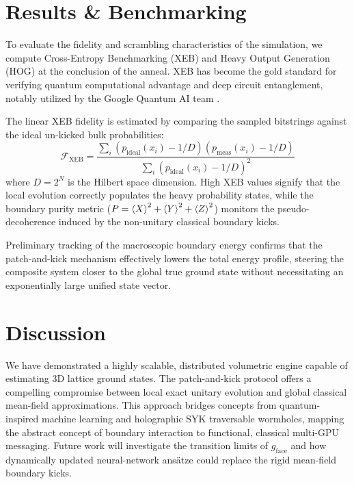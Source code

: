 \documentclass[11pt,a4paper]{article}
\begin{document}
\section{Results \& Benchmarking}

To evaluate the fidelity and scrambling characteristics of the simulation, we compute Cross-Entropy Benchmarking (XEB) and Heavy Output Generation (HOG) at the conclusion of the anneal. XEB has become the gold standard for verifying quantum computational advantage and deep circuit entanglement, notably utilized by the Google Quantum AI team \cite{arute2019quantum}.

The linear XEB fidelity is estimated by comparing the sampled bitstrings against the ideal un-kicked bulk probabilities:
\begin{equation}
    \mathcal{F}_{\text{XEB}} = \frac{\sum_i (p_{\text{ideal}}(x_i) - 1/D)(p_{\text{meas}}(x_i) - 1/D)}{\sum_i (p_{\text{ideal}}(x_i) - 1/D)^2}
\end{equation}
where $D = 2^N$ is the Hilbert space dimension. High XEB values signify that the local evolution correctly populates the heavy probability states, while the boundary purity metric ($P = \ev{X}^2 + \ev{Y}^2 + \ev{Z}^2$) monitors the pseudo-decoherence induced by the non-unitary classical boundary kicks.

Preliminary tracking of the macroscopic boundary energy confirms that the patch-and-kick mechanism effectively lowers the total energy profile, steering the composite system closer to the global true ground state without necessitating an exponentially large unified state vector.

\section{Discussion}

We have demonstrated a highly scalable, distributed volumetric engine capable of estimating 3D lattice ground states. The patch-and-kick protocol offers a compelling compromise between local exact unitary evolution and global classical mean-field approximations. This approach bridges concepts from quantum-inspired machine learning and holographic SYK traversable wormholes, mapping the abstract concept of boundary interaction to functional, classical multi-GPU messaging. Future work will investigate the transition limits of $g_{\text{face}}$ and how dynamically updated neural-network ansätze could replace the rigid mean-field boundary kicks.
\end{document}
